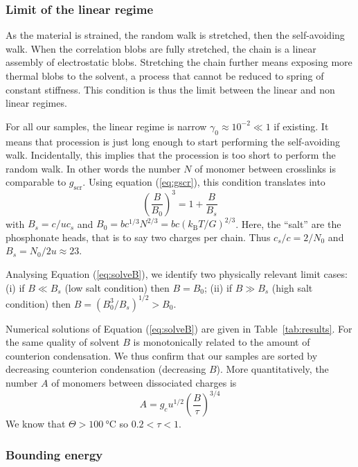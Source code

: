 \documentclass[journal=jacsat,manuscript=article]{achemso}
\begin{document}
\subsubsection{Limit of the linear regime}

As the material is strained, the random walk is stretched, then the self-avoiding walk. When the correlation blobs are fully stretched, the chain is a linear assembly of electrostatic blobs. Stretching the chain further means exposing more thermal blobs to the solvent, a process that cannot be reduced to spring of constant stiffness. This condition is thus the limit between the linear and non linear regimes.

For all our samples, the linear regime is narrow $\gamma_0\approx 10^{-2}\ll 1$ if existing. It means that procession is just long enough to start performing the self-avoiding walk. Incidentally, this implies that the procession is too short to perform the random walk. In other words the number $N$ of monomer between crosslinks is comparable to $g_\mathrm{scr}$. Using equation (\ref{eq:gscr}), this condition translates into
\begin{equation}
\left(\frac{B}{B_0}\right)^3 = 1 + \frac{B}{B_s}
\label{eq:solveB}
\end{equation}
with $B_s = c/u c_s$ and $B_0 = b c^{1/3} N^{2/3} = bc \left(k_\mathrm{B}T/G\right)^{2/3}$. Here, the ``salt'' are the phosphonate heads, that is to say two charges per chain. Thus $c_s/c = 2/N_0$ and $B_s = N_0/2u \approx 23$.

Analysing Equation (\ref{eq:solveB}), we identify two physically relevant limit cases: (i) if $B \ll B_s$ (low salt condition) then $B = B_0$; (ii) if $B \gg B_s$ (high salt condition) then $B = \left(B_0^3/B_s\right)^{1/2} > B_0$.

Numerical solutions of Equation (\ref{eq:solveB}) are given in Table~\ref{tab:results}. For the same quality of solvent $B$ is monotonically related to the amount of counterion condensation. We thus confirm that our samples are sorted by decreasing counterion condensation (decreasing $B$). More quantitatively, the number $A$ of monomers between dissociated charges is
\begin{equation}
A = g_c u^{1/2} \left(\frac{B}{\tau}\right)^{3/4}
\end{equation}
We know that $\Theta>\SI{100}{\celsius}$ so $0.2<\tau<1$.

\subsubsection{Bounding energy}
\end{document}
